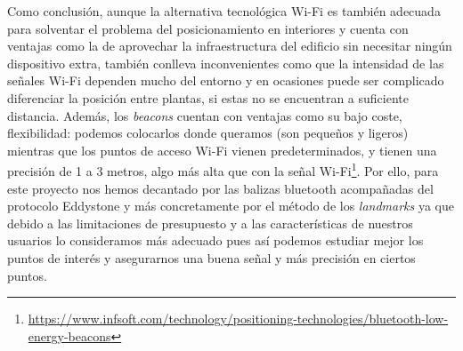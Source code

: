 Como conclusión, aunque la alternativa tecnológica Wi-Fi es también adecuada para solventar el problema del posicionamiento en interiores y cuenta con ventajas como la de aprovechar la infraestructura del edificio sin necesitar ningún dispositivo extra, también conlleva inconvenientes como que la intensidad de las señales Wi-Fi dependen mucho del entorno y en ocasiones puede ser complicado diferenciar la posición entre plantas, si estas no se encuentran a suficiente distancia. Además, los \textit{beacons} cuentan con ventajas como su bajo coste, flexibilidad: podemos colocarlos donde queramos (son pequeños y ligeros) mientras que los puntos de acceso Wi-Fi vienen predeterminados, y tienen una precisión de 1 a 3 metros, algo más alta que con la señal Wi-Fi\footnote{\url{https://www.infsoft.com/technology/positioning-technologies/bluetooth-low-energy-beacons}}. Por ello, para este proyecto nos hemos decantado por las balizas bluetooth acompañadas del protocolo Eddystone y más concretamente por el método de los \textit{landmarks} ya que debido a las limitaciones de presupuesto y a las características de nuestros usuarios lo consideramos más adecuado pues así podemos estudiar mejor los puntos de interés y asegurarnos una buena señal y más precisión en ciertos puntos.






 